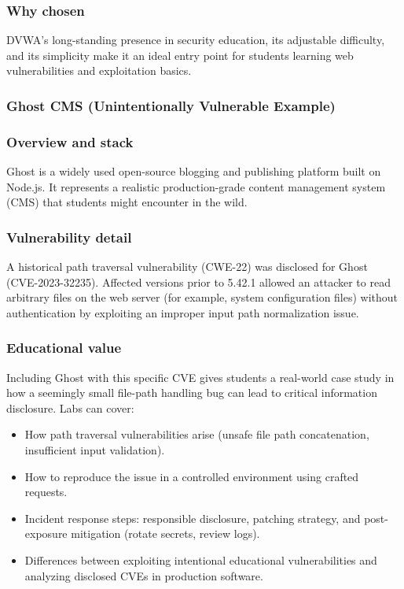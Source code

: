 \documentclass[12pt]{article}
\begin{document}
\subsubsection*{Why chosen}
DVWA’s long-standing presence in security education, its adjustable difficulty, and its simplicity make it an ideal entry point for students learning web vulnerabilities and exploitation basics.



\subsubsection{Ghost CMS (Unintentionally Vulnerable Example)}
\subsubsection*{Overview and stack}
Ghost is a widely used open-source blogging and publishing platform built on Node.js. It represents a realistic production-grade content management system (CMS) that students might encounter in the wild.

\subsubsection*{Vulnerability detail}
A historical path traversal vulnerability (CWE-22) was disclosed for Ghost (CVE-2023-32235). Affected versions prior to 5.42.1 allowed an attacker to read arbitrary files on the web server (for example, system configuration files) without authentication by exploiting an improper input path normalization issue.

\subsubsection*{Educational value}
Including Ghost with this specific CVE gives students a real-world case study in how a seemingly small file-path handling bug can lead to critical information disclosure. Labs can cover:
\begin{itemize}
    \item How path traversal vulnerabilities arise (unsafe file path concatenation, insufficient input validation).
    \item How to reproduce the issue in a controlled environment using crafted requests.
    \item Incident response steps: responsible disclosure, patching strategy, and post-exposure mitigation (rotate secrets, review logs).
    \item Differences between exploiting intentional educational vulnerabilities and analyzing disclosed CVEs in production software.
\end{itemize}
\end{document}
